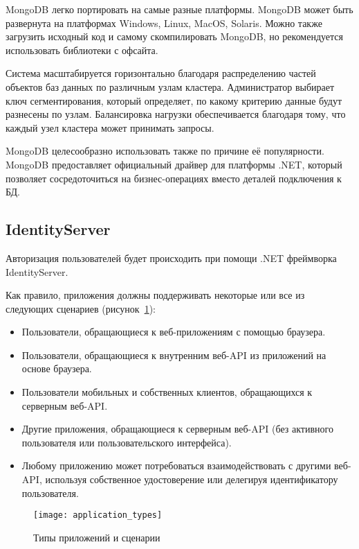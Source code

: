 MongoDB легко портировать на самые разные платформы. MongoDB может быть развернута на платформах Windows, Linux, MacOS, Solaris. Можно также загрузить исходный код и самому скомпилировать MongoDB, но рекомендуется использовать библиотеки с офсайта.

Система масштабируется горизонтально благодаря распределению частей объектов баз данных по различным узлам кластера. Администратор выбирает ключ сегментирования, который определяет, по какому критерию данные будут разнесены по узлам. Балансировка нагрузки обеспечивается благодаря тому, что каждый узел кластера может принимать запросы.

MongoDB целесообразно использовать также по причине её популярности. MongoDB предоставляет официальный драйвер для платформы .NET, который позволяет сосредоточиться на бизнес-операциях вместо деталей подключения к БД.


\subsection{IdentityServer}

Авторизация пользователей будет происходить при помощи .NET фреймворка IdentityServer.

Как правило, приложения должны поддерживать некоторые или все из следующих сценариев (рисунок~\ref{fig:application_types}):

\begin{itemize}
    \item Пользователи, обращающиеся к веб-приложениям с помощью браузера.
    \item Пользователи, обращающиеся к внутренним веб-API из приложений на основе браузера.
    \item Пользователи мобильных и собственных клиентов, обращающихся к серверным веб-API.
    \item Другие приложения, обращающиеся к серверным веб-API (без активного пользователя или пользовательского интерфейса).
    \item Любому приложению может потребоваться взаимодействовать с другими веб-API, используя собственное удостоверение или делегируя идентификатору пользователя.
\end{itemize}

\begin{figure}[ht]
    \centering
    \texttt{[image: application\_types]}
    \caption{Типы приложений и сценарии}\label{fig:application_types}
\end{figure}

